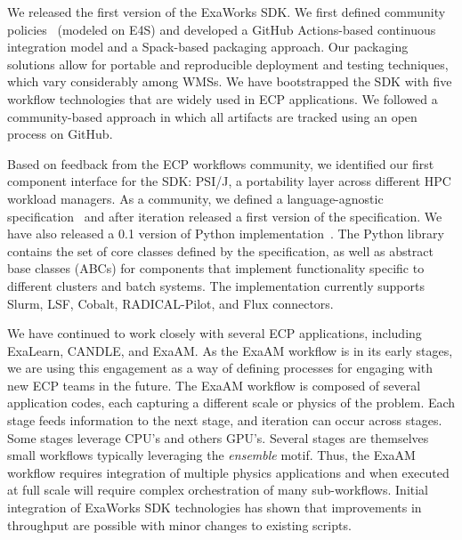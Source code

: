 We released the first version of the ExaWorks SDK. We first defined
community policies~\cite{sdk-policies} (modeled on E4S) and
developed a GitHub Actions-based continuous integration model and 
a Spack-based packaging approach. 
Our packaging solutions allow for portable and reproducible deployment and 
testing techniques, which vary considerably among WMSs.
We have bootstrapped the SDK with five workflow technologies 
that are widely used in ECP applications. We followed a community-based
approach in which all artifacts are tracked using an open process on GitHub. 

Based on feedback from the ECP workflows community, we identified our 
first component interface for the SDK: PSI/J, a portability layer across different HPC workload managers. 
As a community, we defined a language-agnostic specification~\cite{jpsi-spec}
and after iteration released a first version of the specification. 
We have also released a 0.1 version of Python implementation~\cite{jpsi-python}. 
The Python library contains the set of
core classes defined by the specification, as well as abstract base classes (ABCs) for components 
that implement functionality specific to different clusters and batch systems.
The implementation currently supports Slurm, LSF, Cobalt, RADICAL-Pilot, and Flux connectors. 

We have continued to work closely with several ECP applications, including 
ExaLearn, CANDLE, and ExaAM.
As the ExaAM workflow is in its early stages, we are using this engagement
as a way of defining processes for engaging with new ECP teams in the future.  
The ExaAM workflow is composed of several application codes, each capturing a
different scale or physics of the problem.  Each stage feeds
information to the next stage, and iteration can occur across stages.  Some
stages leverage CPU's and others GPU's. Several stages are themselves small
workflows typically leveraging the \textit{ensemble} motif. Thus, the ExaAM
workflow requires integration of multiple physics applications and when
executed at full scale will require complex orchestration of many
sub-workflows.  
Initial integration of ExaWorks SDK technologies has shown that
improvements in throughput are possible with minor changes to existing scripts.

